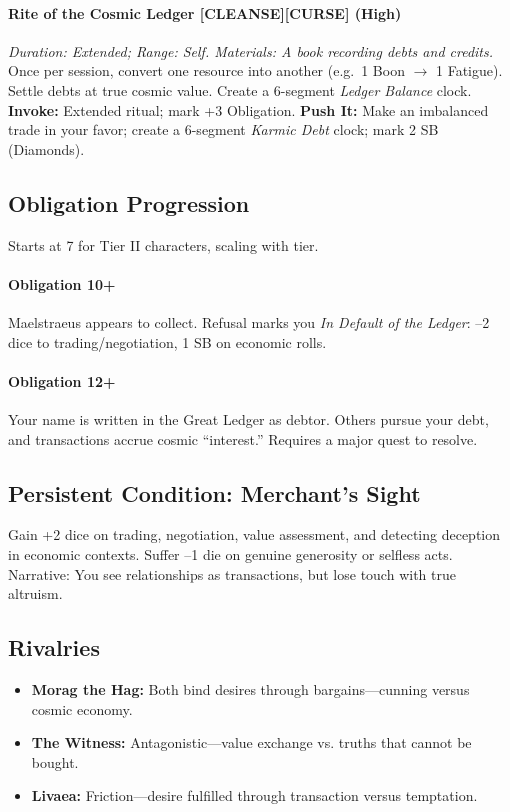 \paragraph{Rite of the Cosmic Ledger [CLEANSE][CURSE] (High)}  
\emph{Duration: Extended; Range: Self. Materials: A book recording debts and credits.}  
Once per session, convert one resource into another (e.g.\ 1 Boon $\rightarrow$ 1 Fatigue). Settle debts at true cosmic value. Create a 6-segment \emph{Ledger Balance} clock.  
\textbf{Invoke:} Extended ritual; mark +3 Obligation.  
\textbf{Push It:} Make an imbalanced trade in your favor; create a 6-segment \emph{Karmic Debt} clock; mark 2 SB (Diamonds).

\subsection*{Obligation Progression}
Starts at 7 for Tier II characters, scaling with tier.

\paragraph{Obligation 10+} Maelstraeus appears to collect. Refusal marks you \emph{In Default of the Ledger}: --2 dice to trading/negotiation, 1 SB on economic rolls.  

\paragraph{Obligation 12+} Your name is written in the Great Ledger as debtor. Others pursue your debt, and transactions accrue cosmic ``interest.'' Requires a major quest to resolve.

\subsection*{Persistent Condition: Merchant's Sight}
Gain +2 dice on trading, negotiation, value assessment, and detecting deception in economic contexts. Suffer --1 die on genuine generosity or selfless acts. Narrative: You see relationships as transactions, but lose touch with true altruism.

\subsection*{Rivalries}
\begin{itemize}
\item \textbf{Morag the Hag:} Both bind desires through bargains---cunning versus cosmic economy.  
\item \textbf{The Witness:} Antagonistic---value exchange vs. truths that cannot be bought.  
\item \textbf{Livaea:} Friction---desire fulfilled through transaction versus temptation.  
\end{itemize}

